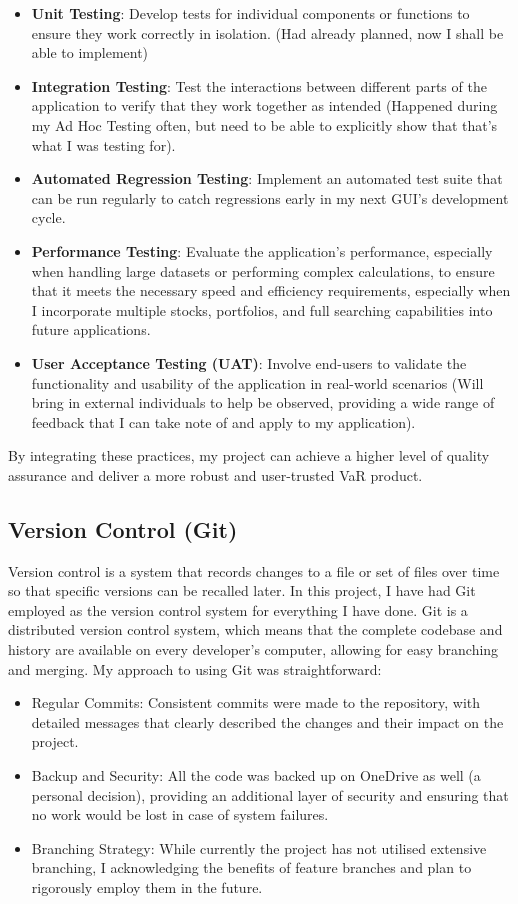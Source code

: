 \documentclass{article}
\begin{document}
\begin{itemize}
    \item \textbf{Unit Testing}: Develop tests for individual components or functions to ensure they work correctly in isolation. (Had already planned, now I shall be able to implement)
    \item \textbf{Integration Testing}: Test the interactions between different parts of the application to verify that they work together as intended (Happened during my Ad Hoc Testing often, but need to be able to explicitly show that that's what I was testing for).
    \item \textbf{Automated Regression Testing}: Implement an automated test suite that can be run regularly to catch regressions early in my next GUI's development cycle.
    \item \textbf{Performance Testing}: Evaluate the application's performance, especially when handling large datasets or performing complex calculations, to ensure that it meets the necessary speed and efficiency requirements, especially when I incorporate multiple stocks, portfolios, and full searching capabilities into future applications.
    \item \textbf{User Acceptance Testing (UAT)}: Involve end-users to validate the functionality and usability of the application in real-world scenarios (Will bring in external individuals to help be observed, providing a wide range of feedback that I can take note of and apply to my application).
\end{itemize}

By integrating these practices, my project can achieve a higher level of quality assurance and deliver a more robust and user-trusted VaR product.

\subsection{Version Control (Git)} 

Version control is a system that records changes to a file or set of files over time so that specific versions can be recalled later. In this project, I have had Git employed as the version control system for everything I have done.
Git is a distributed version control system, which means that the complete codebase and history are available on every developer's computer, allowing for easy branching and merging. My approach to using Git was straightforward:

\begin{itemize}
    \item Regular Commits: Consistent commits were made to the repository, with detailed messages that clearly described the changes and their impact on the project.
    \item Backup and Security: All the code was backed up on OneDrive as well (a personal decision), providing an additional layer of security and ensuring that no work would be lost in case of system failures.
    \item Branching Strategy: While currently the project has not utilised extensive branching, I acknowledging the  benefits of feature branches and plan to rigorously employ them in the future.
\end{itemize}
\end{document}
